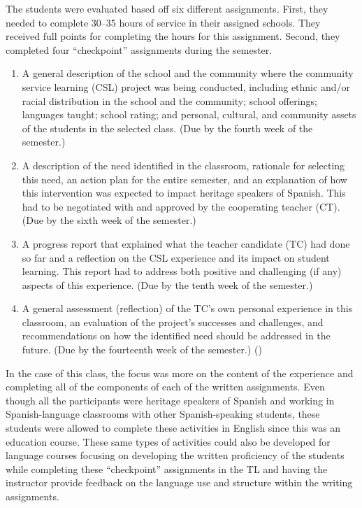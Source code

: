 \documentclass[output=paper]{langscibook}
\begin{document}
The students were evaluated based off six different assignments. First, they needed to complete 30--35 hours of service in their assigned schools. They received full points for completing the hours for this assignment. Second, they completed four “checkpoint” assignments during the semester.\largerpage[-2]

\begin{enumerate}[label={(\arabic*)},align=left]
\item A general description of the school and the community where the community service learning (CSL) project was being conducted, including ethnic and/or racial distribution in the school and the community; school offerings; languages taught; school rating; and personal, cultural, and community assets of the students in the selected class. (Due by the fourth week of the semester.)

\item A description of the need identified in the classroom, rationale for selecting this need, an action plan for the entire semester, and an explanation of how this intervention was expected to impact heritage speakers of Spanish. This had to be negotiated with and approved by the cooperating teacher (CT). (Due by the sixth week of the semester.)

\item A progress report that explained what the teacher candidate (TC) had done so far and a reflection on the CSL experience and its impact on student learning. This report had to address both positive and challenging (if any) aspects of this experience. (Due by the tenth week of the semester.)

\item A general assessment (reflection) of the TC’s own personal experience in this classroom, an evaluation of the project’s successes and challenges, and recommendations on how the identified need should be addressed in the future. (Due by the fourteenth week of the semester.) (\citeyear[1062--1063]{Salgado-RoblesLamboy2019})
\end{enumerate}

In the case of this class, the focus was more on the content of the experience and completing all of the components of each of the written assignments. Even though all the participants were heritage speakers of Spanish and working in Spanish-language classrooms with other Spanish-speaking students, these students were allowed to complete these activities in English since this was an education course. These same types of activities could also be developed for language courses focusing on developing the written proficiency of the students while completing these “checkpoint” assignments in the TL and having the instructor provide feedback on the language use and structure within the writing assignments.
\end{document}
